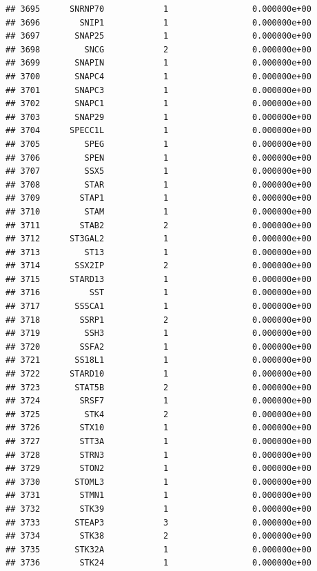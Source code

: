 \documentclass[
]{article}
\begin{document}
\begin{verbatim}
## 3695      SNRNP70            1                 0.000000e+00
## 3696        SNIP1            1                 0.000000e+00
## 3697       SNAP25            1                 0.000000e+00
## 3698         SNCG            2                 0.000000e+00
## 3699       SNAPIN            1                 0.000000e+00
## 3700       SNAPC4            1                 0.000000e+00
## 3701       SNAPC3            1                 0.000000e+00
## 3702       SNAPC1            1                 0.000000e+00
## 3703       SNAP29            1                 0.000000e+00
## 3704      SPECC1L            1                 0.000000e+00
## 3705         SPEG            1                 0.000000e+00
## 3706         SPEN            1                 0.000000e+00
## 3707         SSX5            1                 0.000000e+00
## 3708         STAR            1                 0.000000e+00
## 3709        STAP1            1                 0.000000e+00
## 3710         STAM            1                 0.000000e+00
## 3711        STAB2            2                 0.000000e+00
## 3712      ST3GAL2            1                 0.000000e+00
## 3713         ST13            1                 0.000000e+00
## 3714       SSX2IP            2                 0.000000e+00
## 3715      STARD13            1                 0.000000e+00
## 3716          SST            1                 0.000000e+00
## 3717       SSSCA1            1                 0.000000e+00
## 3718        SSRP1            2                 0.000000e+00
## 3719         SSH3            1                 0.000000e+00
## 3720        SSFA2            1                 0.000000e+00
## 3721       SS18L1            1                 0.000000e+00
## 3722      STARD10            1                 0.000000e+00
## 3723       STAT5B            2                 0.000000e+00
## 3724        SRSF7            1                 0.000000e+00
## 3725         STK4            2                 0.000000e+00
## 3726        STX10            1                 0.000000e+00
## 3727        STT3A            1                 0.000000e+00
## 3728        STRN3            1                 0.000000e+00
## 3729        STON2            1                 0.000000e+00
## 3730       STOML3            1                 0.000000e+00
## 3731        STMN1            1                 0.000000e+00
## 3732        STK39            1                 0.000000e+00
## 3733       STEAP3            3                 0.000000e+00
## 3734        STK38            2                 0.000000e+00
## 3735       STK32A            1                 0.000000e+00
## 3736        STK24            1                 0.000000e+00

\end{verbatim}
\end{document}
